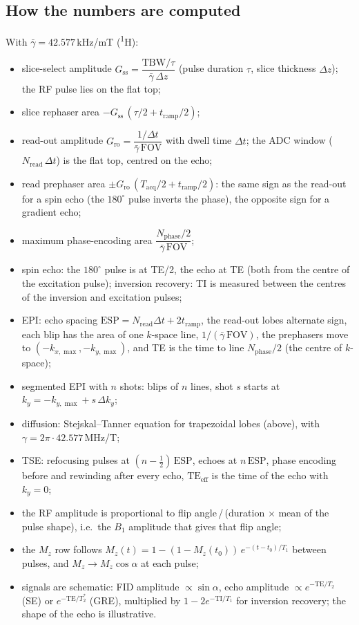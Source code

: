 \documentclass[11pt]{article}
\begin{document}
\subsection{How the numbers are computed}\label{sec:physics}
With $\bar\gamma = 42.577$\,kHz/mT (\textsuperscript{1}H):
\begin{itemize}
\item slice-select amplitude $G_\mathrm{ss} = \dfrac{\mathrm{TBW}/\tau}{\bar\gamma\,\Delta z}$
      (pulse duration $\tau$, slice thickness $\Delta z$); the RF pulse lies on the flat top;
\item slice rephaser area $-G_\mathrm{ss}\,(\tau/2 + t_\mathrm{ramp}/2)$;
\item read-out amplitude $G_\mathrm{ro} = \dfrac{1/\Delta t}{\bar\gamma\,\mathrm{FOV}}$
      with dwell time $\Delta t$; the ADC window ($N_\mathrm{read}\,\Delta t$) is the flat top,
      centred on the echo;
\item read prephaser area $\pm G_\mathrm{ro}\,(T_\mathrm{acq}/2 + t_\mathrm{ramp}/2)$:
      the same sign as the read-out for a spin echo (the $180^\circ$ pulse inverts the phase),
      the opposite sign for a gradient echo;
\item maximum phase-encoding area $\dfrac{N_\mathrm{phase}/2}{\bar\gamma\,\mathrm{FOV}}$;
\item spin echo: the $180^\circ$ pulse is at TE/2, the echo at TE (both from the centre
      of the excitation pulse); inversion recovery: TI is measured between the
      centres of the inversion and excitation pulses;
\item EPI: echo spacing $\mathrm{ESP}=N_\mathrm{read}\Delta t + 2t_\mathrm{ramp}$, the
      read-out lobes alternate sign, each blip has the area of one $k$-space line,
      $1/(\bar\gamma\,\mathrm{FOV})$, the prephasers move to
      $(-k_{x,\max},-k_{y,\max})$, and TE is the time to line $N_\mathrm{phase}/2$
      (the centre of $k$-space);
\item segmented EPI with $n$ shots: blips of $n$ lines, shot $s$ starts at
      $k_y = -k_{y,\max} + s\,\Delta k_y$;
\item diffusion: Stejskal--Tanner equation for trapezoidal lobes (above), with
      $\gamma = 2\pi\cdot 42.577$\,MHz/T;
\item TSE: refocusing pulses at $(n-\tfrac12)\,\mathrm{ESP}$, echoes at
      $n\,\mathrm{ESP}$, phase encoding before and rewinding after every echo,
      $\mathrm{TE}_\mathrm{eff}$ is the time of the echo with $k_y=0$;
\item the RF amplitude is proportional to flip angle\,/\,(duration $\times$ mean of the
      pulse shape), i.e.\ the $B_1$ amplitude that gives that flip angle;
\item the $M_z$ row follows $M_z(t) = 1-(1-M_z(t_0))\,e^{-(t-t_0)/T_1}$ between pulses,
      and $M_z \to M_z\cos\alpha$ at each pulse;
\item signals are schematic: FID amplitude $\propto\sin\alpha$, echo amplitude
      $\propto e^{-\mathrm{TE}/T_2}$ (SE) or $e^{-\mathrm{TE}/T_2^*}$ (GRE), multiplied by
      $1-2e^{-\mathrm{TI}/T_1}$ for inversion recovery; the shape of the echo is
      illustrative.
\end{itemize}
\end{document}
